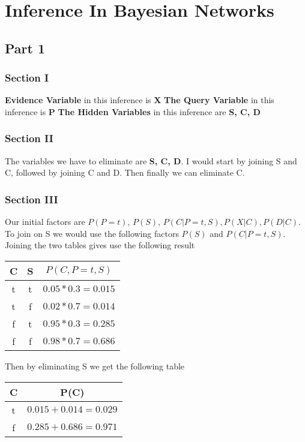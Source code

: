 \documentclass[a4paper, 12pt]{article}
\begin{document}
	\newpage			
			
	\section{Inference In Bayesian Networks}
		\subsection{Part 1}
			\subsubsection{Section I}
				\textbf{Evidence Variable} in this inference is \textbf{X}
				\textbf{The Query Variable} in this inference is \textbf{P}
				\textbf{The Hidden Variables} in this inference are \textbf{S, C, D}
				
			\subsubsection{Section II}
				The variables we have to eliminate are \textbf{S, C, D}. I would start by joining S and C, followed by joining C and D. Then finally we can eliminate C.
				
			\subsubsection{Section III}
				Our initial factors are $P(P=t)$, $P(S)$, $P(C|P=t,S), P(X|C), P(D|C)$. To join on S we would use the following factors $P(S)$ and $P(C|P=t,S)$. Joining the two tables gives use the following result
				
				\begin{tabular}{|c|c|c|}
					\hline
					C & S & $P(C, P=t, S)$\\
					\hline
					t & t & $0.05 * 0.3 = 0.015$\\
					t & f & $0.02 * 0.7 = 0.014$\\
					f & t & $0.95 * 0.3 = 0.285$\\
					f & f & $0.98 * 0.7 = 0.686$\\
					\hline
				\end{tabular}
				
				Then by eliminating S we get the following table
				
				\begin{tabular}{|c|c|}
					\hline
					C & P(C)\\
					\hline
					t & $0.015 + 0.014 = 0.029$\\
					f & $0.285 + 0.686 = 0.971$\\
					\hline
				\end{tabular}
			
\end{document}
